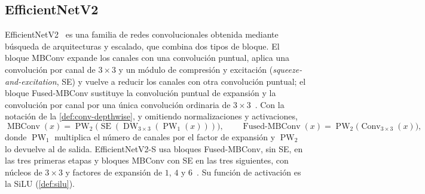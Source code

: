 \subsection{EfficientNetV2}\label{sec:efficientnet}

EfficientNetV2~\cite{tan2021} es una familia de redes convolucionales obtenida
mediante búsqueda de arquitecturas y escalado, que combina dos tipos de bloque. El
bloque MBConv expande los canales con una convolución puntual, aplica una
convolución por canal de $3\times3$ y un módulo de compresión y excitación
(\emph{squeeze-and-excitation}, SE) y vuelve a reducir los canales con otra
convolución puntual; el bloque Fused-MBConv sustituye la convolución puntual de
expansión y la convolución por canal por una única convolución ordinaria de
$3\times3$~\cite[sec.~3.2, fig.~2]{tan2021}. Con la notación de la
\cref{def:conv-depthwise}, y omitiendo normalizaciones y activaciones,
\[
  \operatorname{MBConv}(x) = \operatorname{PW}_2\bigl(\operatorname{SE}(\operatorname{DW}_{3\times3}(\operatorname{PW}_1(x)))\bigr),
  \qquad
  \operatorname{Fused\text{-}MBConv}(x) = \operatorname{PW}_2\bigl(\operatorname{Conv}_{3\times3}(x)\bigr),
\]
donde $\operatorname{PW}_1$ multiplica el número de canales por el factor de
expansión y $\operatorname{PW}_2$ lo devuelve al de salida. EfficientNetV2-S usa
bloques Fused-MBConv, sin SE, en las tres primeras etapas y bloques MBConv con SE en
las tres siguientes, con núcleos de $3\times3$ y factores de expansión de $1$, $4$
y $6$~\cite[tabla~4]{tan2021}. Su función de activación es la SiLU
(\cref{def:silu}).

\endinput
